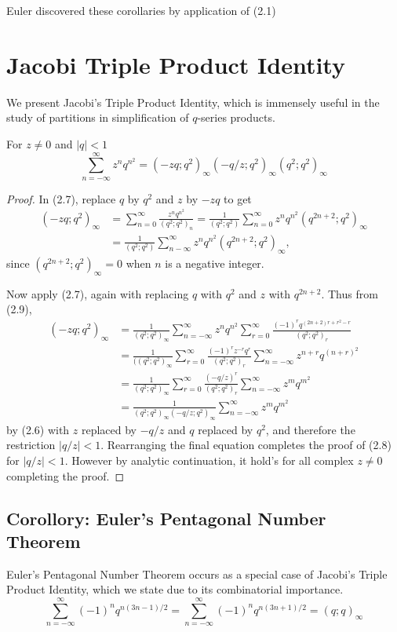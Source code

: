 Euler discovered these corollaries by application of (2.1)
\newpage
\section{Jacobi Triple Product Identity}
We present Jacobi's Triple Product Identity, which is immensely useful in the study of partitions in simplification of $q$-series products.
\begin{theorem}
For $z \neq 0$ and $|q| < 1$
\begin{equation}
    \sum_{n = -\infty}^{\infty} z^n q^{n^2} = (-zq;q^2)_\infty (-q/z;q^2)_\infty (q^2;q^2)_\infty
\end{equation}
\end{theorem}
\begin{proof}
    In (2.7), replace $q$ by $q^2$ and $z$ by $-zq$ to get
\begin{equation}
\begin{split}
      (-zq;q^2)_\infty &= \sum_{n = 0}^{\infty} \frac{z^n q^{n^2}}{(q^2;q^2)_n} = \frac{1}{(q^2;q^2)}\sum_{n = 0}^{\infty} z^n q^{n^2}(q^{2n+2};q^2)_\infty \\
    &= \frac{1}{(q^2;q^2)}\sum_{n-\infty}^{\infty} z^n q^{n^2}(q^{2n+2};q^2)_\infty,
\end{split}
\end{equation}
since $(q^{2n+2};q^2)_\infty = 0$ when $n$ is a negative integer.

Now apply (2.7), again with replacing $q$ with $q^2$ and $z$ with $q^{2n+2}$. Thus from (2.9),
\begin{align*}
(-zq;q^2)_\infty &= \frac{1}{(q^2;q^2)_\infty}\sum_{n = -\infty}^{\infty} z^nq^{n^2} \sum_{r=0}^\infty \frac{(-1)^rq^{(2n+2)r+r^2-r}}{(q^2;q^2)_r}\\
&= \frac{1}{((q^2;q^2)_\infty} \sum_{r = 0}^{\infty} \frac{(-1)^rz^{-r}q^r}{(q^2;q^2)_r} \sum_{n= -\infty}^\infty z^{n+r}q^{(n+r)^2}
\\&= \frac{1}{(q^2;q^2)_\infty} \sum_{r = 0}^{\infty} \frac{(-q/z)^r}{(q^2;q^2)_r} \sum_{n= -\infty}^\infty z^mq^{m^2}
\\&= \frac{1}{(q^2;q^2)_\infty(-q/z;q^2)_\infty} \sum_{n= -\infty}^\infty z^mq^{m^2}
\end{align*}
\newpage
by (2.6) with $z$ replaced by $-q/z$ and $q$ replaced by $q^2$, and therefore the restriction $|q/z| < 1$. Rearranging the final equation completes the proof of (2.8) for $|q/z| < 1$. However by analytic continuation, it hold's for all complex $z \neq 0$ completing the proof.
\end{proof}

\subsection{Corollory: Euler's Pentagonal Number Theorem}
Euler's Pentagonal Number Theorem occurs as a special case of Jacobi's Triple Product Identity, which we state due to its combinatorial importance.
\begin{equation}
    \sum_{n = -\infty}^{\infty} (-1)^nq^{n(3n-1)/2} = \sum_{n = -\infty}^{\infty} (-1)^nq^{n(3n+1)/2} = (q;q)_\infty
\end{equation}
